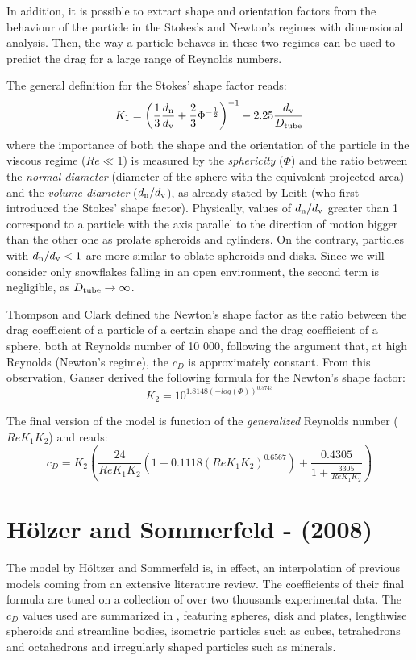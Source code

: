 		In addition, it is possible to extract shape and orientation factors	from the behaviour of the particle in the Stokes’s and Newton’s regimes with dimensional analysis. Then, the way a particle behaves in these two regimes can be used to predict the drag for a large range of Reynolds numbers.
		
		The general definition for the Stokes' shape factor reads:
		\begin{equation}
			K_1 = \left( \frac{1}{3} \frac{d_{\textup{n}}}{d_{\textup{v}}} + \frac{2}{3} \Phi^{-\frac{1}{2}} \right)^{-1} -2.25 \frac{d_{\textup{v}}}{D_{\textup{tube}}} 
		\end{equation}
		where the importance of both the shape and the orientation of the particle in the viscous regime ($ Re \ll 1 $) is measured by the \textit{sphericity} ($ \Phi $) and the ratio between the \textit{normal diameter} (diameter of the sphere with the equivalent projected area) and the \textit{volume diameter} ($ d_{\textup{n}} / d_{\textup{v}} $), as already stated by Leith \cite{Leith-1987} (who first introduced the Stokes' shape factor). Physically, values of $ d_{\textup{n}} / d_{\textup{v}} $ greater than 1 correspond to a particle with the axis parallel to the direction of motion bigger than the other one as prolate spheroids and cylinders. On the contrary, particles with $ d_{\textup{n}} / d_{\textup{v}} < 1 $ are more similar to oblate spheroids and disks.
		Since we will consider only snowflakes falling in an open environment, the second term is negligible, as $ D_{\textup{tube}} \rightarrow \infty $.
		
		Thompson and Clark \cite{ThompsonClark-1991} defined the Newton's shape factor as the ratio between the drag coefficient of a particle of a certain shape and the drag coefficient of a sphere, both at Reynolds number of 10 000, following the argument that, at high Reynolds (Newton's regime), the $ c_D $ is approximately constant.
		From this observation, Ganser derived the following formula for the Newton's shape factor:
		\begin{equation}
			K_2 = 10^{1.8148 (-log(\Phi))^{0.5743}}
		\end{equation}
		
		The final version of the model is function of the \textit{generalized} Reynolds number ($ Re K_1 K_2 $) and reads:
		\begin{equation}
			c_D = K_2 \left( \frac{24}{Re K_1 K_2} (1 + 0.1118 (Re K_1 K_2)^{0.6567}) + \frac{0.4305}{1 + \frac{3305}{Re K_1 K_2}}\right) 
		\end{equation}
	
				
	\section{H\"{o}lzer and Sommerfeld - (2008)}
		The model by H\"{o}ltzer and Sommerfeld \cite{HoltzerSommerfeld-2008} is, in effect, an interpolation of previous models coming from an extensive literature review. The coefficients of their final formula are tuned on a collection of over two thousands experimental data. The $ c_D $ values used are summarized in , featuring spheres, disk and plates, lengthwise spheroids and streamline bodies, isometric particles such as cubes, tetrahedrons and octahedrons and irregularly shaped particles such as minerals.
		
